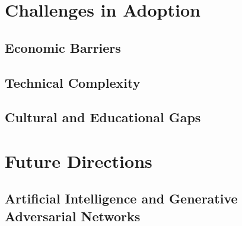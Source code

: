     \section{Challenges in Adoption}
        \subsection{Economic Barriers}
        \subsection{Technical Complexity}
        \subsection{Cultural and Educational Gaps}
    \section{Future Directions}
        \subsection{Artificial Intelligence and Generative Adversarial Networks}